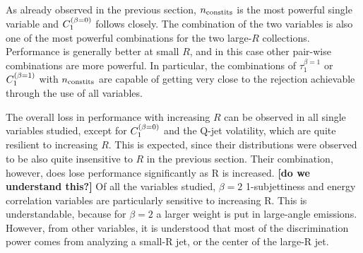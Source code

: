 As already observed in the previous section, $n_{\rm constits}$ is the most powerful single variable and
$C_{1}^{(\beta=0)}$ follows closely. The combination of the two variables is also one of the most powerful
combinations for the two large-$R$ collections. Performance is generally better at small $R$, and in this case other pair-wise combinations are more powerful. In particular,
the combinations of $\tau^{\beta=1}_1$ or $C_{1}^{(\beta=1)}$ with $n_{\rm constits}$ are capable of 
getting very  close to the rejection achievable through the use of all variables.

The overall loss in performance
with increasing $R$ can be observed in all single variables studied, except for $C_{1}^{(\beta=0)}$ and 
the Q-jet volatility, which are quite resilient to increasing $R$. This is expected, since their distributions
were observed to be also quite insensitive to $R$ in the previous section. Their combination, however, does lose
performance significantly as R is increased. {\bf [do we understand this?]}
Of all the variables studied, $\beta=2$ 1-subjettiness and energy correlation variables 
are particularly sensitive to increasing R. This is understandable, because for $\beta=2$ 
a larger weight is put in large-angle emissions. However, from other variables, it is understood
that most of the discrimination power comes from analyzing a small-R jet, or the center of the
large-R jet. 

